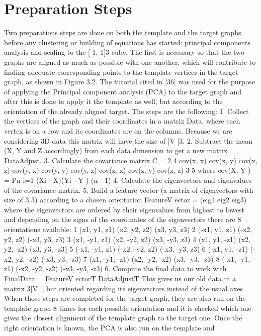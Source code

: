 \documentclass[../structure.tex]{subfiles}
\begin{document}
\section{Preparation Steps}
Two preparations steps are done on both the template and the target graphs
before any clustering or building of equations has started: principal components
analysis and scaling to the [-1, 1]3 cube. The first is necessary so that
the two graphs are aligned as much as possible with one another, which will
contribute to finding adequate corresponding points to the template vertices
in the target graph, as shown in Figure 3.2.
The tutorial cited in [36] was used for the purpose of applying the Principal
component analysis (PCA) to the target graph and after this is done to
apply it the template as well, but according to the orientation of the already
aligned target. The steps are the following:
1. Collect the vertices of the graph and their coordinates in a matrix Data,
where each vertex is on a row and its coordinates are on the columns.
Because we are considering 3D data this matrix will have the size of
|V |3.
2. Subtract the mean (X, Y and Z accordingly) from each data dimension
to get a new matrix DataAdjust.
3. Calculate the covariance matrix
C =
2
4
cov(x, x) cov(x, y) cov(x, z)
cov(y, x) cov(y, y) cov(y, z)
cov(z, x) cov(z, y) cov(z, z)
3
5
where
cov(X, Y ) =
Pn
i=1
(Xi - X)(Yi - Y )
(n - 1)
4. Calculate the eigenvectors and eigenvalues of the covariance matrix.
5. Build a feature vector (a matrix of eigenvectors with size of 3  3)
according to a chosen orientation
FeatureV ector = (eig1 eig2 eig3)
where the eigenvectors are ordered by their eigenvalues from highest to
lowest and depending on the signs of the coordinates of the eigenvectors
there are 8 orientations available:
1 (x1, y1, z1) (x2, y2, z2) (x3, y3, z3)
2 (-x1, y1, z1) (-x2, y2, z2) (-x3, y3, z3)
3 (x1, -y1, z1) (x2, -y2, z2) (x3, -y3, z3)
4 (x1, y1, -z1) (x2, y2, -z2) (x3, y3, -z3)
5 (-x1, -y1, z1) (-x2, -y2, z2) (-x3, -y3, z3)
6 (-x1, y1, -z1) (-x2, y2, -z2) (-x3, y3, -z3)
7 (x1, -y1, -z1) (x2, -y2, -z2) (x3, -y3, -z3)
8 (-x1, -y1, -z1) (-x2, -y2, -z2) (-x3, -y3, -z3)
6. Compute the final data to work with
FinalData = FeatureV ectorT  DataAdjustT
This gives us our old data in a matrix 3|V |, but oriented regarding
its eigenvectors instead of the usual axes
When those steps are completed for the target graph, they are also run
on the template graph 8 times for each possible orientation and it is checked
which one gives the closest alignment of the template graph to the target one.
Once the right orientation is known, the PCA is also run on the template and
\end{document}
